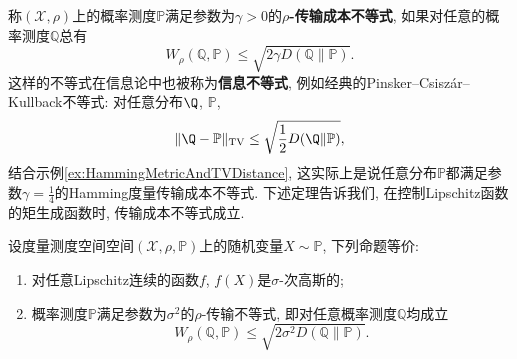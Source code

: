 称$(\mathcal{X}, \rho)$上的概率测度$\mathbb{P}$满足参数为$\gamma > 0$的\textbf{$\rho$-传输成本不等式}, 如果对任意的概率测度$\mathbb{Q}$总有
 \begin{equation}\label{eq:TransportationCostInequality}
 	W_{\rho} (\mathbb{Q}, \mathbb{P}) \leq \sqrt{2 \gamma D(\mathbb{Q} \| \mathbb{P})}.
 \end{equation}
 这样的不等式在信息论中也被称为\textbf{信息不等式}, 例如经典的Pinsker–Csiszár–Kullback不等式: 对任意分布$\Q$, $\mathbb{P}$, 
 \begin{equation}\label{eq:Pinsker–Csiszár–Kullback}
 	\|\Q - \mathbb{P}\|_{\text{TV}} \leq \sqrt{\frac{1}{2}D(\Q\|\mathbb{P})}, 
 \end{equation}
 结合示例\ref{ex:HammingMetricAndTVDistance}, 这实际上是说任意分布$\mathbb{P}$都满足参数$\gamma = \frac{1}{4}$的Hamming度量传输成本不等式. 
下述定理告诉我们, 在控制Lipschitz函数的矩生成函数时, 传输成本不等式成立. 

\begin{theorem}\label{thm:Bobkov-Götze}
	设度量测度空间空间$(\mathcal{X}, \rho, \mathbb{P})$上的随机变量$X \sim \mathbb{P}$, 下列命题等价: 
	\begin{enumerate}[label=(\alph*)]
		\item 对任意Lipschitz连续的函数$f$, $f(X)$是$\sigma$-次高斯的;
		\item 概率测度$\mathbb{P}$满足参数为$\sigma^2$的$\rho$-传输不等式, 即对任意概率测度$\mathbb{Q}$均成立
			\begin{equation*}
				W_{\rho}(\mathbb{Q}, \mathbb{P}) \leq \sqrt{2 \sigma^2 D(\mathbb{Q} \| \mathbb{P})}. 
			\end{equation*}
	\end{enumerate}
\end{theorem}

